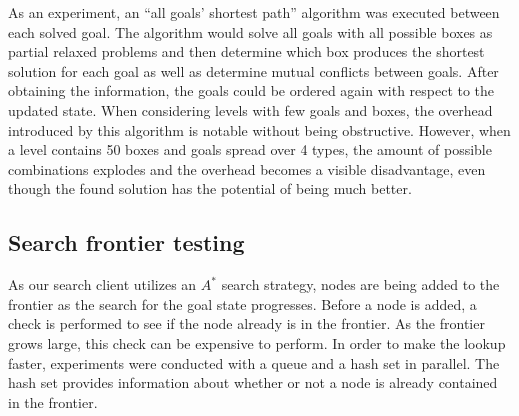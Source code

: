 \documentclass[Main]{subfiles}
\begin{document}
As an experiment, an ``all goals' shortest path'' algorithm was executed between each solved goal. The algorithm would solve all goals with all possible boxes as partial relaxed problems and then determine which box produces the shortest solution for each goal as well as determine mutual conflicts between goals. After obtaining the information, the goals could be ordered again with respect to the updated state. When considering levels with few goals and boxes, the overhead introduced by this algorithm is notable without being obstructive. However, when a level contains 50 boxes and goals spread over 4 types, the amount of possible combinations explodes and the overhead becomes a visible disadvantage, even though the found solution has the potential of being much better. 











\subsection{Search frontier testing}

As our search client utilizes an $A^*$ search strategy, nodes are being added to the frontier as the search for the goal state progresses. Before a node is added, a check is performed to see if the node already is in the frontier. As the frontier grows large, this check can be expensive to perform. In order to make the lookup faster, experiments were conducted with a queue and a hash set in parallel. The hash set provides information about whether or not a node is already contained in the frontier.
\end{document}
